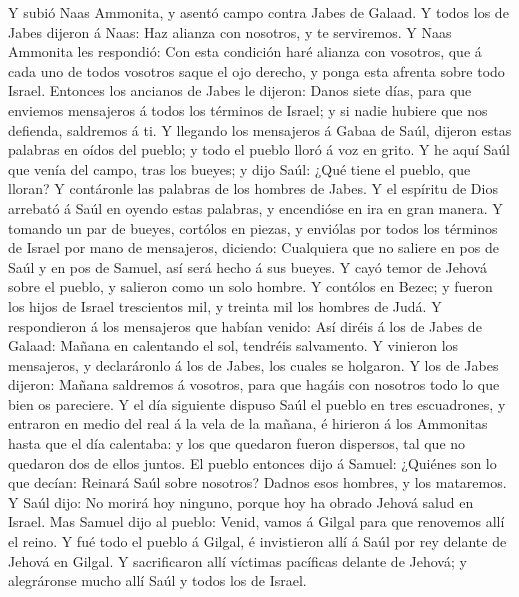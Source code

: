 Y subió Naas Ammonita, y asentó campo contra Jabes de
Galaad. Y todos los de Jabes dijeron á Naas: Haz alianza con nosotros, y
te serviremos.  Y Naas Ammonita les respondió: Con esta
condición haré alianza con vosotros, que á cada uno de todos vosotros
saque el ojo derecho, y ponga esta afrenta sobre todo Israel.
 Entonces los ancianos de Jabes le dijeron: Danos siete
días, para que enviemos mensajeros á todos los términos de Israel; y si
nadie hubiere que nos defienda, saldremos á ti.  Y
llegando los mensajeros á Gabaa de Saúl, dijeron estas palabras en oídos
del pueblo; y todo el pueblo lloró á voz en grito.  Y he
aquí Saúl que venía del campo, tras los bueyes; y dijo Saúl: ¿Qué tiene
el pueblo, que lloran? Y contáronle las palabras de los hombres de
Jabes.  Y el espíritu de Dios arrebató á Saúl en oyendo
estas palabras, y encendióse en ira en gran manera.  Y
tomando un par de bueyes, cortólos en piezas, y enviólas por todos los
términos de Israel por mano de mensajeros, diciendo: Cualquiera que no
saliere en pos de Saúl y en pos de Samuel, así será hecho á sus bueyes.
Y cayó temor de Jehová sobre el pueblo, y salieron como un solo hombre.
 Y contólos en Bezec; y fueron los hijos de Israel
trescientos mil, y treinta mil los hombres de Judá.  Y
respondieron á los mensajeros que habían venido: Así diréis á los de
Jabes de Galaad: Mañana en calentando el sol, tendréis salvamento. Y
vinieron los mensajeros, y declaráronlo á los de Jabes, los cuales se
holgaron.  Y los de Jabes dijeron: Mañana saldremos á
vosotros, para que hagáis con nosotros todo lo que bien os pareciere.
 Y el día siguiente dispuso Saúl el pueblo en tres
escuadrones, y entraron en medio del real á la vela de la mañana, é
hirieron á los Ammonitas hasta que el día calentaba: y los que quedaron
fueron dispersos, tal que no quedaron dos de ellos juntos.
 El pueblo entonces dijo á Samuel: ¿Quiénes son lo que
decían: Reinará Saúl sobre nosotros? Dadnos esos hombres, y los
mataremos.  Y Saúl dijo: No morirá hoy ninguno, porque
hoy ha obrado Jehová salud en Israel.  Mas Samuel dijo al
pueblo: Venid, vamos á Gilgal para que renovemos allí el reino.
 Y fué todo el pueblo á Gilgal, é invistieron allí á Saúl
por rey delante de Jehová en Gilgal. Y sacrificaron allí víctimas
pacíficas delante de Jehová; y alegráronse mucho allí Saúl y todos los
de Israel.

